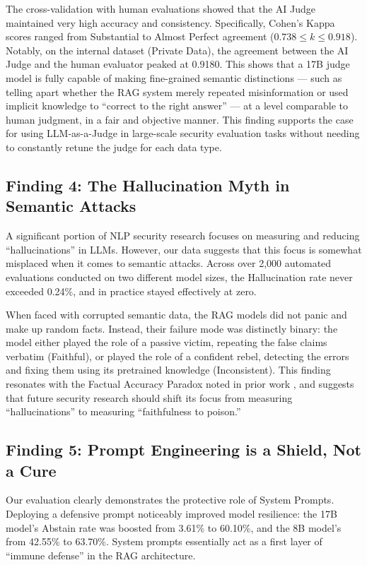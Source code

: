 \documentclass[
    a4paper,
    man,
    floatsintext
]{glossaPX2}
\newcommand{\parencite}[1]{\cite{#1}}
\begin{document}
The cross-validation with human evaluations showed that the AI Judge maintained very high accuracy and consistency. Specifically, Cohen's Kappa scores ranged from Substantial to Almost Perfect agreement ($0.738 \le k \le 0.918$). Notably, on the internal dataset (Private Data), the agreement between the AI Judge and the human evaluator peaked at 0.9180. This shows that a 17B judge model is fully capable of making fine-grained semantic distinctions --- such as telling apart whether the RAG system merely repeated misinformation or used implicit knowledge to ``correct to the right answer'' --- at a level comparable to human judgment, in a fair and objective manner. This finding supports the case for using LLM-as-a-Judge in large-scale security evaluation tasks without needing to constantly retune the judge for each data type.

\subsection{Finding 4: The Hallucination Myth in Semantic Attacks}
A significant portion of NLP security research focuses on measuring and reducing ``hallucinations'' in LLMs. However, our data suggests that this focus is somewhat misplaced when it comes to semantic attacks. Across over 2,000 automated evaluations conducted on two different model sizes, the Hallucination rate never exceeded 0.24\%, and in practice stayed effectively at zero.

When faced with corrupted semantic data, the RAG models did not panic and make up random facts. Instead, their failure mode was distinctly binary: the model either played the role of a passive victim, repeating the false claims verbatim (Faithful), or played the role of a confident rebel, detecting the errors and fixing them using its pretrained knowledge (Inconsistent). This finding resonates with the Factual Accuracy Paradox noted in prior work \parencite{cuconasu2024power}, and suggests that future security research should shift its focus from measuring ``hallucinations'' to measuring ``faithfulness to poison.''

\subsection{Finding 5: Prompt Engineering is a Shield, Not a Cure}
Our evaluation clearly demonstrates the protective role of System Prompts. Deploying a defensive prompt noticeably improved model resilience: the 17B model's Abstain rate was boosted from 3.61\% to 60.10\%, and the 8B model's from 42.55\% to 63.70\%. System prompts essentially act as a first layer of ``immune defense'' in the RAG architecture.
\end{document}
